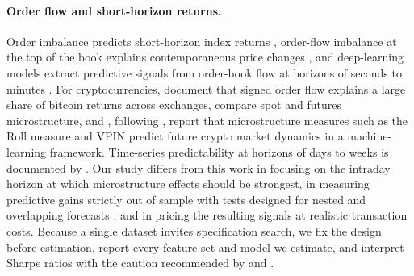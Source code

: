 \paragraph{Order flow and short-horizon returns.} Order imbalance predicts short-horizon index
returns \citep{chordia2002}, order-flow imbalance at the top of the book explains contemporaneous
price changes \citep{cont2014}, and deep-learning models extract predictive signals from
order-book flow at horizons of seconds to minutes \citep{kolm2023}. For cryptocurrencies,
\citet{makarov2020} document that signed order flow explains a large share of bitcoin returns across
exchanges, \citet{aleti2021} compare spot and futures microstructure, and
\citet{easley2024crypto}, following \citet{easley2021machine}, report that microstructure measures
such as the Roll measure and VPIN predict future crypto market dynamics in a machine-learning
framework. Time-series predictability at horizons of days to weeks is documented by
\citet{liu2021}. Our study differs from this work in focusing on the intraday horizon at which
microstructure effects should be strongest, in measuring predictive gains strictly out of sample
with tests designed for nested and overlapping forecasts \citep{clark2007,campbell2008}, and in
pricing the resulting signals at realistic transaction costs. Because a single dataset invites
specification search, we fix the design before estimation, report every feature set and model we
estimate, and interpret Sharpe ratios with the caution recommended by \citet{bailey2014} and
\citet{harvey2016}.
